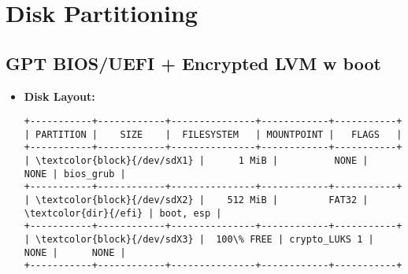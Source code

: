 \documentclass[10pt, a4paper, onecolumn, openany]{book} %
\begin{document}
\section{Disk Partitioning}
\subsection{GPT BIOS/UEFI + Encrypted LVM w boot}
\begin{itemize}
    \item \textbf{Disk Layout:}
\begin{Verbatim}[commandchars=\\\{\}]
+-----------+------------+---------------+------------+-----------+
| PARTITION |    SIZE    |  FILESYSTEM   | MOUNTPOINT |   FLAGS   |
+-----------+------------+---------------+------------+-----------+
| \textcolor{block}{/dev/sdX1} |      1 MiB |          NONE |       NONE | bios_grub |
+-----------+------------+---------------+------------+-----------+
| \textcolor{block}{/dev/sdX2} |    512 MiB |         FAT32 |       \textcolor{dir}{/efi} | boot, esp |
+-----------+------------+---------------+------------+-----------+
| \textcolor{block}{/dev/sdX3} |  100\% FREE | crypto_LUKS 1 |       NONE |      NONE |
+-----------+------------+---------------+------------+-----------+
\end{Verbatim}

\end{itemize}
\end{document}
